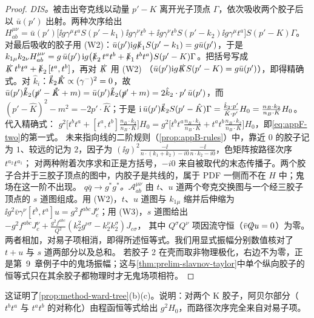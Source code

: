 \begin{proof}
\emph{DIS。}被击出夸克线以动量 $p'-K$ 离开光子顶点 $\Gamma$，依次吸收两个胶子后以 $\bar u(p')$ 出射。两种次序给出
$H^{\mu\nu}_{ab}=\bar u(p')\bigl[\ii g\gamma^\mu t^aS(p'-k_1)\ii g\gamma^\nu t^b+\ii g\gamma^\nu t^bS(p'-k_2)\ii g\gamma^\mu t^a\bigr]S(p'-K)\Gamma$。
对最后吸收的胶子用 (W2)：$\bar u(p')\mathrm{i} g\slashed{k}_1S(p'-k_1)=g\bar u(p')$，于是
$k_{1\mu}k_{2\nu}H^{\mu\nu}_{ab}=g\,\bar u(p')\,\mathrm{i} g\bigl(\slashed{k}_2\,t^at^b+\slashed{k}_1\,t^bt^a\bigr)S(p'-K)\Gamma$。把括号写成 $\slashed{K}\,t^bt^a+\slashed{k}_2\,[t^a,t^b]$，再对 $\slashed{K}$ 用 (W2)
（$\bar u(p')\mathrm{i} g\slashed{K}S(p'-K)=g\bar u(p')$），即得精确式。对 $\hat k_i$：$\slashed{\hat k}_2\slashed{\hat K}\propto(\gamma^-)^2=0$，故
$\bar u(p')\slashed{\hat k}_2(\slashed{p}'-\slashed{\hat K}+m)=\bar u(p')\slashed{\hat k}_2(\slashed{p}'+m)=2\hat k_2\cdot p'\,\bar u(p')$，而 $(p'-\hat K)^2-m^2=-2p'\cdot\hat K$；于是
$\mathrm{i}\,\bar u(p')\slashed{\hat k}_2S(p'-\hat K)\Gamma=\frac{\hat k_2\cdot p'}{\hat K\cdot p'}H_0=\frac{n_B\cdot k_2}{n_B\cdot K}H_0$。代入精确式：
$g^2\bigl[t^bt^a+[t^a,t^b]\frac{n_B\cdot k_2}{n_B\cdot K}\bigr]H_0=g^2\bigl[t^bt^a\frac{n_B\cdot k_1}{n_B\cdot K}+t^at^b\frac{n_B\cdot k_2}{n_B\cdot K}\bigr]H_0$，即\cref{eq:appF-two}的第一式。
未来指向线的二阶规则（\cref{prop:appB-rules}）中，靠近 $0$ 的胶子记为 $1$、较远的记为 $2$，因子为 $(\ii g)^2\frac{-\ii}{n\cdot(k_1+k_2)-i0}\frac{-\ii}{n\cdot k_2-i0}$，色矩阵按路径次序 $t^{a_2}t^{a_1}$；
对两种附着次序求和正是方括号，$-i0$ 来自被取代的末态传播子。两个胶子合并于三胶子顶点的图中，内胶子是共线的，属于 PDF 一侧而不在 $H$ 中；鬼场在这一阶不出现。
\emph{$q\bar q\to g^*g^*$。}$\mathcal A^{\mu\nu}_{ab}$ 由 $t$、$u$ 道两个夸克交换图与一个经三胶子顶点的 $s$ 道图组成。用 (W2)，$t$、$u$ 道图与 $k_{1\mu}$ 缩并后伸缩为
$\ii g^2\bar v\gamma^\nu[t^b,t^a]u=g^2f^{abc}J_c^\nu$；用 (W3)，$s$ 道图给出 $-g^2f^{abc}J_c^\nu+\frac{g^2f^{abc}}{Q^2}(k_2^2g^{\nu\sigma}-k_2^\nu k_2^\sigma)J_{c\sigma}$，
其中 $Q^\sigma Q^\nu$ 项因流守恒（$\bar v\slashed{Q}u=0$）为零。两者相加，对易子项相消，即得所述恒等式。我们用显式振幅分别数值核对了 $t+u$ 与 $s$ 道两部分以及总和。%
若胶子 2 在壳而取非物理极化，右边不为零，正是第~9~章例子中的鬼场振幅；这与\cref{thm:prelim-slavnov-taylor}中单个纵向胶子的恒等式只在其余胶子都物理时才无鬼场项相符。
\end{proof}

这证明了\cref{prop:method-ward-tree}(b)(c)。说明：对两个 K 胶子，阿贝尔部分（$t^bt^a$ 与 $t^at^b$ 的对称化）由程函恒等式给出 $g^2H_0$，而路径次序完全来自对易子项。

